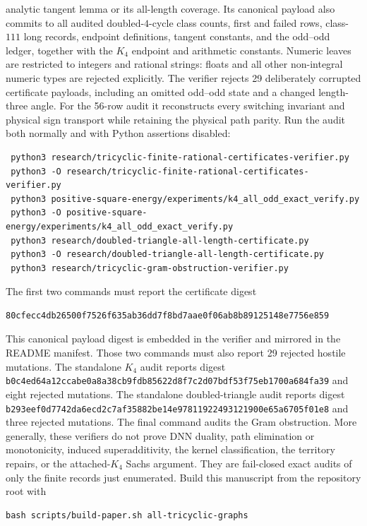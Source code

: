 \documentclass[11pt]{article}
\theoremstyle{remark}
\begin{document}
analytic tangent lemma or its all-length coverage.  Its canonical payload also
commits to all audited doubled-$4$-cycle class counts, first and failed rows,
class-$111$ long records, endpoint definitions, tangent constants, and the
odd--odd ledger, together with the $K_4$ endpoint and arithmetic constants.
Numeric leaves are restricted to integers and rational strings: floats and all
other non-integral numeric types are rejected explicitly.  The verifier rejects
29 deliberately corrupted certificate payloads, including an omitted
odd--odd state and a changed length-three angle.
For the 56-row audit it reconstructs every switching invariant and physical
sign transport while retaining the physical path parity.  Run the audit both
normally and with Python assertions disabled:
\begin{verbatim}
 python3 research/tricyclic-finite-rational-certificates-verifier.py
 python3 -O research/tricyclic-finite-rational-certificates-verifier.py
 python3 positive-square-energy/experiments/k4_all_odd_exact_verify.py
 python3 -O positive-square-energy/experiments/k4_all_odd_exact_verify.py
 python3 research/doubled-triangle-all-length-certificate.py
 python3 -O research/doubled-triangle-all-length-certificate.py
 python3 research/tricyclic-gram-obstruction-verifier.py
\end{verbatim}
The first two commands must report the certificate digest
\begin{verbatim}
80cfecc4db26500f7526f635ab36dd7f8bd7aae0f06ab8b89125148e7756e859
\end{verbatim}
This canonical payload digest is embedded in the verifier and mirrored in the
README manifest.  Those two commands must also report 29 rejected
hostile mutations.  The standalone $K_4$ audit reports digest
\texttt{b0c4ed64a12ccabe0a8a38cb9fdb85622d8f7c2d07bdf53f75eb1700a684fa39}
and eight rejected mutations.  The standalone doubled-triangle audit reports
digest
\texttt{b293eef0d7742da6ecd2c7af35882be14e97811922493121900e65a6705f01e8}
and three rejected mutations.  The final command audits the Gram obstruction.
More generally, these verifiers do not
prove DNN duality, path elimination or monotonicity, induced
superadditivity, the kernel classification, the territory repairs, or the
attached-$K_4$ Sachs argument.  They are fail-closed exact audits of only the
finite records just enumerated.
Build this manuscript from the repository root with
\begin{verbatim}
bash scripts/build-paper.sh all-tricyclic-graphs
\end{verbatim}
\end{document}
